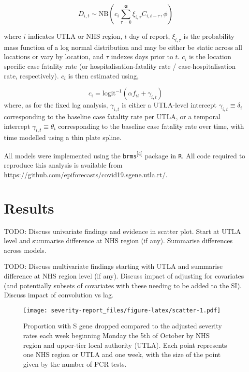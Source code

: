 \documentclass[
]{article}
\begin{document}
\[D_{i,t} \sim \mathrm{NB}\left(c_i\sum_{\tau = 0}^{30} \xi_{i, \tau} C_{i, t-\tau},  \phi \right)\]

where \(i\) indicates UTLA or NHS region, \(t\) day of report,
\(\xi_{i, \tau}\) is the probability mass function of a log normal
distribution and may be either be static across all locations or vary by
location, and \(\tau\) indexes days prior to \(t\). \(c_i\) is the
location specific case fatality rate (or hospitalisation-fatality rate /
case-hospitalisation rate, respectively). \(c_i\) is then estimated
using,

\[c_i = \mathrm{logit}^{-1}\left(\alpha f_{it} + \gamma_{i,t}\right)\]
where, as for the fixed lag analysis, \(\gamma_{i,t}\) is either a
UTLA-level intercept \(\gamma_{i,t}\equiv \delta_i\) corresponding to
the baseline case fatality rate per UTLA, or a temporal intercept
\(\gamma_{i,t}\equiv \theta_t\) corresponding to the baseline case
fatality rate over time, with time modelled using a thin plate spline.

All models were implemented using the
\texttt{brms}\textsuperscript{{[}4{]}} package in \texttt{R}. All code
required to reproduce this analysis is available from
\url{https://github.com/epiforecasts/covid19.sgene.utla.rt/}.

\hypertarget{results}{%
\section{Results}\label{results}}

TODO: Discuss univariate findings and evidence in scatter plot. Start at
UTLA level and summarise difference at NHS region (if any). Summarise
differences across models.

TODO: Discuss multivariate findings starting with UTLA and summarise
difference at NHS region level (if any). Discuss impact of adjusting for
covariates (and potentially subsets of covariates with these needing to
be added to the SI). Discuss impact of convolution vs lag.

\begin{figure}
\centering
\texttt{[image: severity-report\_files/figure-latex/scatter-1.pdf]}
\caption{Proportion with S gene dropped compared to the adjusted
severity rates each week beginning Monday the 5th of October by NHS
region and upper-tier local authority (UTLA). Each point represents one
NHS region or UTLA and one week, with the size of the point given by the
number of PCR tests.}
\end{figure}
\end{document}
